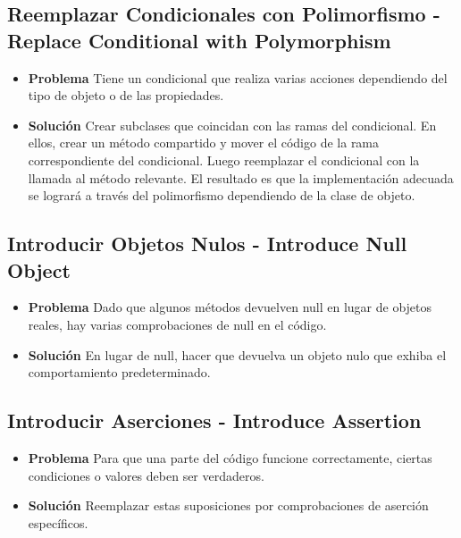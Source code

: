 \documentclass[11pt,a4paper,oneside]{book}
\begin{document}
\subsection{Reemplazar Condicionales con Polimorfismo - Replace Conditional with Polymorphism}     
\begin{itemize}
    \item \textbf{Problema} Tiene un condicional que realiza varias acciones dependiendo del tipo de objeto o de las propiedades.
    
    
    
    \item \textbf{Solución} Crear subclases que coincidan con las ramas del condicional. En ellos, crear un método compartido y mover el código de la rama correspondiente del condicional. Luego reemplazar el condicional con la llamada al método relevante. El resultado es que la implementación adecuada se logrará a través del polimorfismo dependiendo de la clase de objeto.
    
    
\end{itemize}
    
\subsection{Introducir Objetos Nulos - Introduce Null Object}        
\begin{itemize}
    \item \textbf{Problema} Dado que algunos métodos devuelven null en lugar de objetos reales, hay varias comprobaciones de null en el código.
    
    
    
    \item \textbf{Solución} En lugar de null, hacer que devuelva un objeto nulo que exhiba el comportamiento predeterminado.
    
    
\end{itemize}    

 \subsection{Introducir Aserciones - Introduce Assertion}    
\begin{itemize}
    \item \textbf{Problema} Para que una parte del código funcione correctamente, ciertas condiciones o valores deben ser verdaderos.
    
    
    
    \item \textbf{Solución} Reemplazar estas suposiciones por comprobaciones de aserción específicos.
    
    
\end{itemize}  
\end{document}
